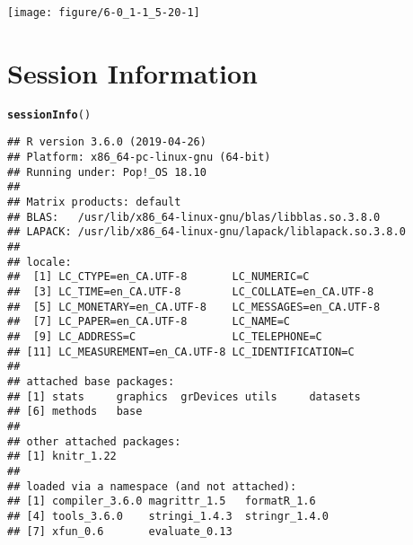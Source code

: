 \documentclass[11pt,letter]{article}\usepackage[]{graphicx}\usepackage[]{color}
\makeatletter
\def\maxwidth{ %
  \ifdim\Gin@nat@width>\linewidth
    \linewidth
  \else
    \Gin@nat@width
  \fi
}
\newcommand{\hlstd}[1]{\textcolor[rgb]{0.345,0.345,0.345}{#1}}%
\newcommand{\hlkwd}[1]{\textcolor[rgb]{0.737,0.353,0.396}{\textbf{#1}}}%
\newenvironment{kframe}{%
 \def\at@end@of@kframe{}%
 \ifinner\ifhmode%
  \def\at@end@of@kframe{\end{minipage}}%
  \begin{minipage}{\columnwidth}%
 \fi\fi%
 \def\FrameCommand##1{\hskip\@totalleftmargin \hskip-\fboxsep
 \colorbox{shadecolor}{##1}\hskip-\fboxsep
     \hskip-\linewidth \hskip-\@totalleftmargin \hskip\columnwidth}%
 \MakeFramed {\advance\hsize-\width
   \@totalleftmargin\z@ \linewidth\hsize
   \@setminipage}}%
 {\par\unskip\endMakeFramed%
 \at@end@of@kframe}
\newenvironment{knitrout}{}{} %
\makeatother
\begin{document}
\begin{knitrout}
\color{fgcolor}
\texttt{[image: figure/6-0\_1-1\_5-20-1]} 

\end{knitrout}

\newpage

\FloatBarrier


\newpage
\appendix
\section{Session Information}
\begin{knitrout}
\color{fgcolor}\begin{kframe}
\begin{alltt}
\hlkwd{sessionInfo}\hlstd{()}
\end{alltt}
\begin{verbatim}
## R version 3.6.0 (2019-04-26)
## Platform: x86_64-pc-linux-gnu (64-bit)
## Running under: Pop!_OS 18.10
## 
## Matrix products: default
## BLAS:   /usr/lib/x86_64-linux-gnu/blas/libblas.so.3.8.0
## LAPACK: /usr/lib/x86_64-linux-gnu/lapack/liblapack.so.3.8.0
## 
## locale:
##  [1] LC_CTYPE=en_CA.UTF-8       LC_NUMERIC=C              
##  [3] LC_TIME=en_CA.UTF-8        LC_COLLATE=en_CA.UTF-8    
##  [5] LC_MONETARY=en_CA.UTF-8    LC_MESSAGES=en_CA.UTF-8   
##  [7] LC_PAPER=en_CA.UTF-8       LC_NAME=C                 
##  [9] LC_ADDRESS=C               LC_TELEPHONE=C            
## [11] LC_MEASUREMENT=en_CA.UTF-8 LC_IDENTIFICATION=C       
## 
## attached base packages:
## [1] stats     graphics  grDevices utils     datasets 
## [6] methods   base     
## 
## other attached packages:
## [1] knitr_1.22
## 
## loaded via a namespace (and not attached):
## [1] compiler_3.6.0 magrittr_1.5   formatR_1.6   
## [4] tools_3.6.0    stringi_1.4.3  stringr_1.4.0 
## [7] xfun_0.6       evaluate_0.13
\end{verbatim}
\end{kframe}
\end{knitrout}
\end{document}
